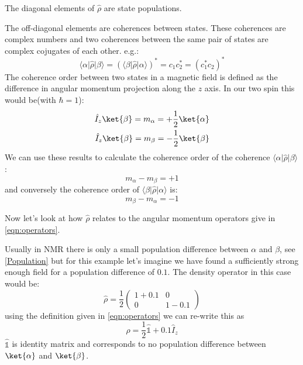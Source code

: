 The diagonal elements of $\hat\rho$ are state populations.

The off-diagonal elements are coherences between states. These coherences are complex numbers and two coherences between the same pair of states are complex cojugates of each other. e.g.:
\begin{equation}
  \langle\alpha\vert\hat\rho\vert\beta\rangle = (\langle\beta\vert\hat\rho\vert\alpha\rangle)^* = c_1c_2^* = (c_1^*c_2)^*
\end{equation}
The coherence order between two states in a magnetic field is defined as the difference in angular
momentum projection along the $z$ axis. In our two spin this would be(with $\hbar = 1$):
\begin{align}
  \hat{I}_z\ket{\beta} = m_\alpha = +\frac{1}{2}\ket{\alpha}\\
  \hat{I}_z\ket{\beta} = m_\beta = -\frac{1}{2}\ket{\beta}
\end{align}
We can use these results to calculate the coherence order of the coherence $\langle\alpha\vert\hat\rho\vert\beta\rangle$:
\begin{equation}
 m_\alpha - m_\beta = +1
\end{equation}
and conversely the coherence order of $\langle\beta\vert\hat\rho\vert\alpha\rangle$ is:
\begin{equation}
  m_\beta - m_\alpha = -1
\end{equation}

Now let's look at how $\hat\rho$ relates to the angular momentum operators give in \ref{eqn:operators}.

Usually in NMR there is only a small population difference between $\alpha$ and $\beta$, see \ref{Population}
but for this example let's imagine we have found a sufficiently strong enough field for a population difference of $0.1$. The density operator in this case would be:
\begin{equation}
  \hat\rho = \frac{1}{2}\begin{pmatrix}
    1 + 0.1 & 0\\
    0 & 1-0.1
\end{pmatrix}
\end{equation}
using the definition given in \ref{eqn:operators} we can re-write this as
\begin{equation}
  \hat\rho = \frac{1}{2}\hat{\mathbb{1}} + 0.1\hat{I}_z
\end{equation}
$\hat{\mathbb{1}}$ is identity matrix and corresponds to no population difference between $\ket{\alpha}$ and $\ket{\beta}$.

